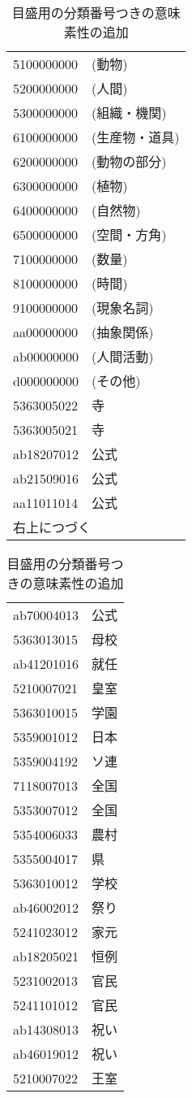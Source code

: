 \begin{enumerate}
\begin{table}[p]
  \caption{目盛用の分類番号つきの意味素性の追加}
    \label{tab:sosei_add_rei}
  \begin{center}
\small\renewcommand{\arraystretch}{}
\begin{tabular}[c]{|ll@{ }|}\hline
5100000000 & (動物)\\
5200000000 & (人間)\\
5300000000 & (組織・機関)\\
6100000000 & (生産物・道具)\\
6200000000 & (動物の部分)\\
6300000000 & (植物)\\
6400000000 & (自然物)\\
6500000000 & (空間・方角)\\
7100000000 & (数量)\\
8100000000 & (時間)\\
9100000000 & (現象名詞)\\
aa00000000 & (抽象関係)\\
ab00000000 & (人間活動)\\
d000000000 & (その他)\\
5363005022 & 寺\\
5363005021 & 寺\\
ab18207012 & 公式\\
ab21509016 & 公式\\
aa11011014 & 公式\\
\multicolumn{2}{|l|}{右上につづく}\\\hline
\end{tabular}
\begin{tabular}[c]{|ll|}\hline
ab70004013 & 公式\\
5363013015 & 母校\\
ab41201016 & 就任\\
5210007021 & 皇室\\
5363010015 & 学園\\
5359001012 & 日本\\
5359004192 & ソ連\\
7118007013 & 全国\\
5353007012 & 全国\\
5354006033 & 農村\\
5355004017 & 県\\
5363010012 & 学校\\
ab46002012 & 祭り\\
5241023012 & 家元\\
ab18205021 & 恒例\\
5231002013 & 官民\\
5241101012 & 官民\\
ab14308013 & 祝い\\
ab46019012 & 祝い\\
5210007022 & 王室\\\hline
\end{tabular}
\end{center}
\end{table}


\end{enumerate}
